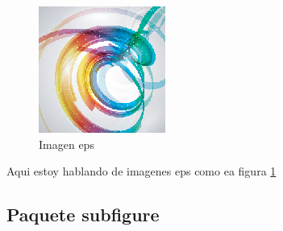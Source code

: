 \documentclass[12pt]{article}
\begin{document}
\begin{figure}[H]
\includegraphics[scale=2]{figuras/epsimg.eps}
\caption{Imagen eps}
\label{figura2}
\end{figure}


Aqui estoy hablando de imagenes eps como ea figura \ref{figura2}

\newpage
\subsection{Paquete subfigure}
\end{document}
